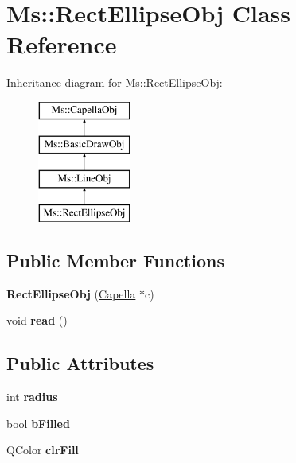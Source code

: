 \hypertarget{class_ms_1_1_rect_ellipse_obj}{}\section{Ms\+:\+:Rect\+Ellipse\+Obj Class Reference}
\label{class_ms_1_1_rect_ellipse_obj}
Inheritance diagram for Ms\+:\+:Rect\+Ellipse\+Obj\+:\begin{figure}[H]
\begin{center}
\leavevmode
\includegraphics[height=4.000000cm]{class_ms_1_1_rect_ellipse_obj}
\end{center}
\end{figure}
\subsection*{Public Member Functions}
\begin{DoxyCompactItemize}
\item 
\mbox{\label{class_ms_1_1_rect_ellipse_obj_adf86a153fe1f7341b1c060c0dc9f37cd}} 
{\bfseries Rect\+Ellipse\+Obj} (\hyperlink{class_ms_1_1_capella}{Capella} $\ast$c)
\item 
\mbox{\label{class_ms_1_1_rect_ellipse_obj_a907cffc92290867444143ca91569bddb}} 
void {\bfseries read} ()
\end{DoxyCompactItemize}
\subsection*{Public Attributes}
\begin{DoxyCompactItemize}
\item 
\mbox{\label{class_ms_1_1_rect_ellipse_obj_a2a823a73f58fce623e6cf8c067ad5ff0}} 
int {\bfseries radius}
\item 
\mbox{\label{class_ms_1_1_rect_ellipse_obj_aafa4d974641b250cb246de35aaed151d}} 
bool {\bfseries b\+Filled}
\item 
\mbox{\label{class_ms_1_1_rect_ellipse_obj_ae9821657481dc9ec31d9e2427897d5af}} 
Q\+Color {\bfseries clr\+Fill}
\end{DoxyCompactItemize}
